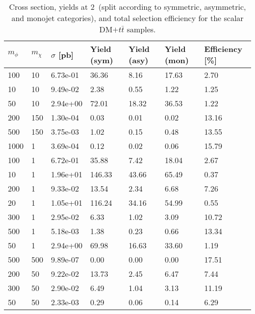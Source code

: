 \begin{table}
\renewcommand{\arraystretch}{1.0}
\small
\centering
\begin{tabular}{lllllll}
\hline
$m_\phi$ & $m_\chi$ & $\sigma$ [pb] & Yield (sym) & Yield (asy) & Yield (mon) & Efficiency [\%] \\ \hline
100       &   10        &   6.73e-01  &   36.36     &   8.16      &   17.63     &   2.70      \\ 
10        &   10        &   9.49e-02  &   2.38      &   0.55      &   1.22      &   1.25      \\ 
50        &   10        &   2.94e+00  &   72.01     &   18.32     &   36.53     &   1.22      \\ 
200       &   150       &   1.30e-04  &   0.03      &   0.01      &   0.02      &   13.16     \\ 
500       &   150       &   3.75e-03  &   1.02      &   0.15      &   0.48      &   13.55     \\ 
1000      &   1         &   3.69e-04  &   0.12      &   0.02      &   0.06      &   15.79     \\ 
100       &   1         &   6.72e-01  &   35.88     &   7.42      &   18.04     &   2.67      \\ 
10        &   1         &   1.96e+01  &   146.33    &   43.66     &   65.49     &   0.37      \\ 
200       &   1         &   9.33e-02  &   13.54     &   2.34      &   6.68      &   7.26      \\ 
20        &   1         &   1.05e+01  &   116.24    &   34.16     &   54.99     &   0.55      \\ 
300       &   1         &   2.95e-02  &   6.33      &   1.02      &   3.09      &   10.72     \\ 
500       &   1         &   5.18e-03  &   1.38      &   0.23      &   0.66      &   13.34     \\ 
50        &   1         &   2.94e+00  &   69.98     &   16.63     &   33.60     &   1.19      \\ 
500       &   500       &   9.89e-07  &   0.00      &   0.00      &   0.00      &   17.51     \\ 
200       &   50        &   9.22e-02  &   13.73     &   2.45      &   6.47      &   7.44      \\ 
300       &   50        &   2.90e-02  &   6.49      &   1.04      &   3.13      &   11.19     \\ 
50        &   50        &   2.33e-03  &   0.29      &   0.06      &   0.14      &   6.29      \\ 
\hline
\end{tabular}
\caption{Cross section, yields at 2~\ifb (split according to symmetric, asymmetric, and monojet categories), and total selection efficiency for the scalar DM$+t\bar{t}$ samples.}
\label{tab:dm_DMttS_2fb}
\end{table}
